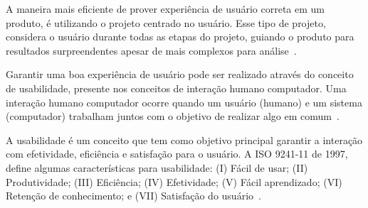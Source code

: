 A maneira mais eficiente de prover experiência de usuário correta em um produto, é utilizando o projeto centrado no usuário. Esse tipo de projeto, considera o usuário durante todas as etapas do projeto, guiando o produto para resultados surpreendentes apesar de mais complexos para análise~\cite{garrett:2010}.

Garantir uma boa experiência de usuário pode ser realizado através do conceito de usabilidade, presente nos conceitos de interação humano computador. Uma interação humano computador ocorre quando um usuário (humano) e um sistema (computador) trabalham juntos com o objetivo de realizar algo em comum~\cite{hartson:2012}.

A usabilidade é um conceito que tem como objetivo principal garantir a interação com efetividade, eficiência e satisfação para o usuário. A ISO 9241-11 de 1997, define algumas características para usabilidade: (I) Fácil de usar; (II) Produtividade; (III) Eficiência; (IV) Efetividade; (V) Fácil aprendizado; (VI) Retenção de conhecimento; e (VII) Satisfação do usuário~\cite{hartson:2012}.
